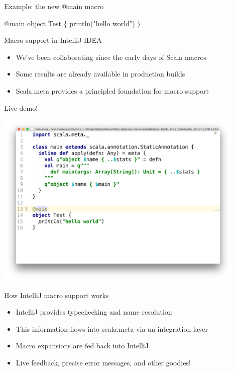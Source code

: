 \documentclass[svgnames,dvipsnames,hyperref={bookmarks=false},usepdftitle=false]{beamer}
\begin{document}
\begin{frame}[fragile]{Example: the new @main macro}
\begin{semiverbatim}
@main object Test \{
  println("hello world")
\}


\end{semiverbatim}
\end{frame}

\begin{frame}{Macro support in IntelliJ IDEA}
\begin{itemize}
\item We've been collaborating since the early days of Scala macros
\item Some results are already available in production builds
\item Scala.meta provides a principled foundation for macro support
\end{itemize}
\end{frame}

\begin{frame}[c, fragile]{Live demo!}
\vskip20pt
\begin{center}
\includegraphics[width=12cm]{intellij.png}
\end{center}
\end{frame}

\begin{frame}{How IntelliJ macro support works}
\begin{itemize}
\item IntelliJ provides typechecking and name resolution
\item This information flows into scala.meta via an integration layer
\item Macro expansions are fed back into IntelliJ
\item Live feedback, precise error messages, and other goodies!
\end{itemize}
\end{frame}
\end{document}

